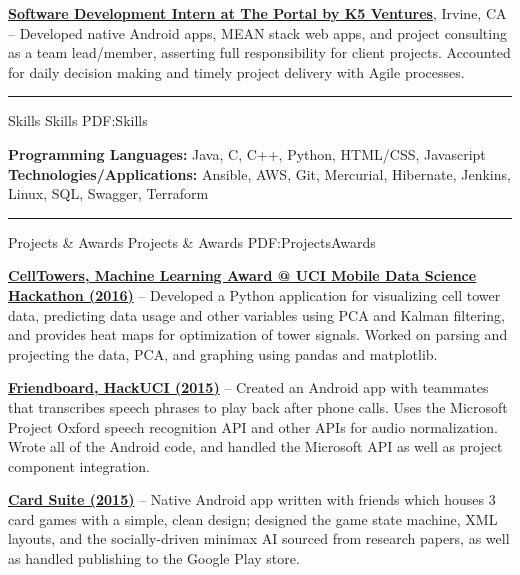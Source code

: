 \documentclass[letterpaper,MMMyyyy,nonstopmode]{simpleresumecv}
\begin{document}
\begin{Body}
\Entry
\href{http://www.theportal.io/}
{\textbf{Software Development Intern at The Portal by K5 Ventures}},
Irvine, CA
\hfill
{} --
\Gap
Developed native Android apps, MEAN stack web apps, and project consulting as a team lead/member, asserting full
responsibility for client projects. Accounted for daily decision making and timely project delivery with Agile processes.\newline

\hrule


\Section
{Skills}
{Skills}
{PDF:Skills}

\begin{flushleft}
\textbf{Programming Languages:} Java, C, C++, Python, HTML/CSS, Javascript
\textbf{Technologies/Applications:} Ansible, AWS, Git, Mercurial, Hibernate, Jenkins, Linux, SQL, Swagger, Terraform \newline
\end{flushleft}

\hrule


\Section
{Projects \& Awards}
{Projects \& Awards}
{PDF:ProjectsAwards}

\Entry
\BulletItem
\href{https://github.com/trizzle21/Datathon2016}
{\textbf{CellTowers, Machine Learning Award @ UCI Mobile Data Science Hackathon (2016)}} -- Developed a Python application for visualizing cell tower data, predicting data usage and other variables using PCA and Kalman filtering, and provides heat maps for optimization of tower signals. Worked on parsing and projecting the data, PCA, and graphing using pandas and matplotlib.\newline

\Entry
\BulletItem
\href{https://github.com/SVT125/HackUCI2015}
{\textbf{Friendboard, HackUCI (2015)}} -- Created an Android app with teammates that transcribes speech phrases to play back after phone calls. Uses the Microsoft Project Oxford speech recognition API and other APIs for audio normalization. Wrote all of the Android code, and handled the Microsoft API as well as project component integration.\newline

\Entry
\BulletItem
\href{https://github.com/SVT125/GermanBridge}
{\textbf{Card Suite (2015)}} -- Native Android app written with friends which houses 3 card games with a simple, clean design; designed the game state machine, XML layouts, and the socially-driven minimax AI sourced from research papers, as well as handled publishing to the Google Play store.\newline


\end{Body}
\end{document}
